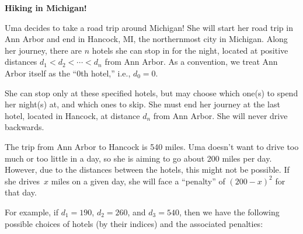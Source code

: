 \documentclass[11pt,addpoints,answers]{exam}
\begin{document}
\begin{questions}
    
  \question \textbf{Hiking in Michigan!}

  Uma decides to take a road trip around Michigan! She will start her road trip in Ann Arbor and end in Hancock, MI, the northernmost city in Michigan. 
  Along her journey, there are $n$ hotels she can stop in for the night, located at positive distances $d_1 < d_2 < \cdots < d_n$ from Ann Arbor. 
  As a convention, we treat Ann Arbor itself as the ``$0$th hotel,'' i.e., $d_0 = 0$.

  She can stop only at these specified hotels, but may choose which one(s) to spend her night(s) at, and which ones to skip.
  She must end her journey at the last hotel, located in Hancock, at distance $d_n$ from Ann Arbor.
  She will never drive backwards.

  The trip from Ann Arbor to Hancock is 540 miles. 
  Uma doesn't want to drive too much or too little in a day, so she is aiming to go about 200 miles per day. 
  However, due to the distances between the hotels, this might not be possible.
  If she drives~$x$ miles on a given day, she will face a ``penalty'' of $(200-x)^2$ for that day.

  For example, if $d_1 = 190$, $d_2 = 260$, and $d_3 = 540$, then we have the following possible choices of hotels (by their indices) and the associated penalties:


\end{questions}
\end{document}
